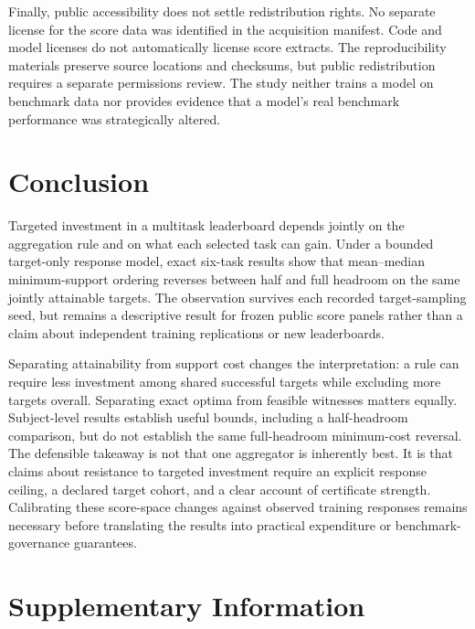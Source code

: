 \documentclass{article}
\begin{document}
Finally, public accessibility does not settle redistribution rights. No separate license for the score data was identified in the acquisition manifest. Code and model licenses do not automatically license score extracts. The reproducibility materials preserve source locations and checksums, but public redistribution requires a separate permissions review. The study neither trains a model on benchmark data nor provides evidence that a model's real benchmark performance was strategically altered.

\section{Conclusion}
Targeted investment in a multitask leaderboard depends jointly on the aggregation rule and on what each selected task can gain. Under a bounded target-only response model, exact six-task results show that mean--median minimum-support ordering reverses between half and full headroom on the same jointly attainable targets. The observation survives each recorded target-sampling seed, but remains a descriptive result for frozen public score panels rather than a claim about independent training replications or new leaderboards.

Separating attainability from support cost changes the interpretation: a rule can require less investment among shared successful targets while excluding more targets overall. Separating exact optima from feasible witnesses matters equally. Subject-level results establish useful bounds, including a half-headroom comparison, but do not establish the same full-headroom minimum-cost reversal. The defensible takeaway is not that one aggregator is inherently best. It is that claims about resistance to targeted investment require an explicit response ceiling, a declared target cohort, and a clear account of certificate strength. Calibrating these score-space changes against observed training responses remains necessary before translating the results into practical expenditure or benchmark-governance guarantees.

\clearpage



\clearpage
\appendix
\section{Supplementary Information}
\end{document}
